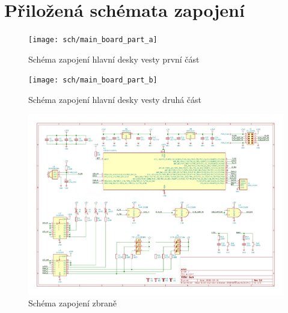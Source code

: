 \chapter*{Přiložená schémata zapojení}

\begin{landscape}
    \begin{figure}[h]
	    \centering
	    \texttt{[image: sch/main\_board\_part\_a]}
	    \caption{Schéma zapojení hlavní desky vesty první část}
    \end{figure}
\end{landscape}

\begin{landscape}
    \begin{figure}[h]
	    \centering
	    \texttt{[image: sch/main\_board\_part\_b]}
	    \caption{Schéma zapojení hlavní desky vesty druhá část}
    \end{figure}
\end{landscape}

\begin{landscape}
    \begin{figure}[h]
	    \centering
	    \includegraphics[height=\textwidth]{sch/gun}
	    \caption{Schéma zapojení zbraně}
    \end{figure}
\end{landscape}

